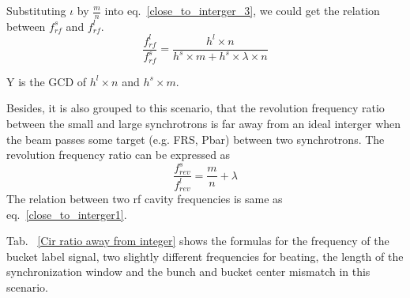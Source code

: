 Substituting $\iota$ by $\frac{m}{n}$ into eq.~\ref{close_to_interger_3}, we could get the relation between $f_{rf}^{s}$ and $f_{rf}^{l}$.
\begin{equation} 
\frac{f_{rf}^{l}}{f_{rf}^{s}}=\frac{h^l\times n}{h^s \times m+ h^s \times\lambda\times n}\label{close_to_interger1}
\end{equation}

Y is the GCD of $h^l\times n$ and $h^s \times m$.


Besides, it is also grouped to this scenario, that the revolution frequency ratio between the small and large synchrotrons is far away from an ideal interger when the beam passes some target (e.g. FRS, Pbar) between two synchrotrons. The revolution frequency ratio can be expressed as
\begin{equation} 
\frac{f_{rev}^{s}}{f_{rev}^{l}}=\frac{m}{n}+ \lambda\label{close_to_interger2}
\end{equation}
The relation between two rf cavity frequencies is same as eq.~\ref{close_to_interger1}.

Tab. ~\ref{Cir ratio away from integer} shows the formulas for the frequency of the bucket label signal, two slightly different frequencies for beating, the length of the synchronization window and the bunch and bucket center mismatch in this scenario.

